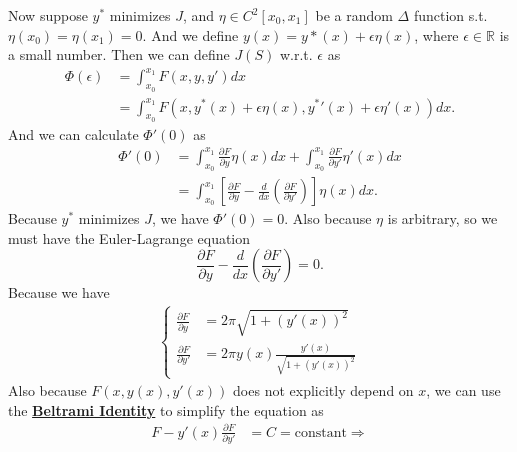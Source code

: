 \documentclass[conference,onecolumn]{IEEEtran}
\begin{document}
\begin{enumerate}
            Now suppose $y^*$ minimizes $J$, and $\eta \in C^2 [x_0, x_1]$ be a random $\Delta$ function s.t. $\eta(x_0) = \eta(x_1) = 0$.
            And we define $y(x) = y*(x) + \epsilon \eta(x)$, where $\epsilon \in \mathbb{R}$ is a small number.
            Then we can define $J(S)$ w.r.t. $\epsilon$ as
            \begin{align*}
                  \Phi (\epsilon) & = \int_{x_0}^{x_1} F(x, y, y') dx                                                     \\
                                  & = \int_{x_0}^{x_1} F(x, y^*(x) + \epsilon \eta(x), {y^*}'(x) + \epsilon \eta'(x)) dx.
            \end{align*}
            And we can calculate $\Phi'(0)$ as
            \begin{align*}
                  \Phi'(0) & = \int_{x_0}^{x_1} \frac{\partial F}{\partial y} \eta (x) dx + \int_{x_0}^{x_1} \frac{\partial F}{\partial y'} \eta'(x) dx               \\
                           & = \int_{x_0}^{x_1} \left[ \frac{\partial F}{\partial y} - \frac{d}{dx} \left( \frac{\partial F}{\partial y'} \right) \right] \eta(x) dx.
            \end{align*}
            Because $y^*$ minimizes $J$, we have $\Phi'(0) = 0$. Also because $\eta$ is arbitrary, so we must have the Euler-Lagrange equation
            $$
                  \frac{\partial F}{\partial y} - \frac{d}{dx} \left( \frac{\partial F}{\partial y'} \right) = 0.
            $$
            Because we have
            \begin{align*}
                  \begin{cases}
                        \frac{\partial F}{\partial y}  & = 2\pi \sqrt{1 + (y'(x))^2}                    \\
                        \frac{\partial F}{\partial y'} & = 2\pi y(x) \frac{y'(x)}{\sqrt{1 + (y'(x))^2}}
                  \end{cases}
            \end{align*}
            Also because $F(x, y(x), y'(x))$ does not explicitly depend on $x$, we can use the \textbf{\href{https://en.wikipedia.org/wiki/Beltrami_identity}{Beltrami Identity}} to simplify the equation as
            \begin{align*}
                  F - y'(x) \frac{\partial F}{\partial y'}                                                                                     & = C = \text{constant} \Rightarrow \\

\end{align*}
\end{enumerate}
\end{document}
